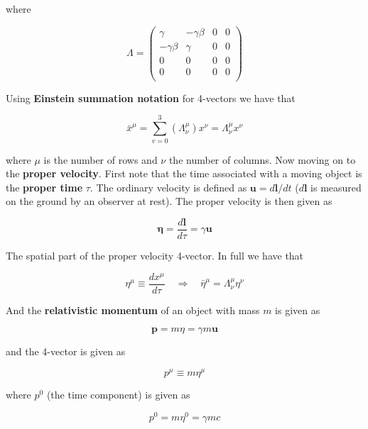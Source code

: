 \documentclass[a4paper]{article}
\begin{document}
where

\begin{equation*}
    \Lambda
    =
    \begin{pmatrix}
        \gamma & -\gamma\beta & 0 & 0 \\
        -\gamma\beta & \gamma & 0 & 0 \\
        0 & 0 & 0 & 0 \\
        0 & 0 & 0 & 0 \\
    \end{pmatrix}
\end{equation*}

Using \textbf{Einstein summation notation} for 4-vectors we have that

\begin{equation*}
    \bar{x}^\mu=\sum_{v=0}^{3}(\Lambda_\nu^\mu)x^\nu=\Lambda_\nu^\mu x^\nu
\end{equation*}

where $\mu$ is the number of rows and $\nu$ the number of columns. Now moving on to the \textbf{proper velocity}. First note that the time associated with a moving object is the \textbf{proper time} $\tau$. The ordinary velocity is defined as $\bm{u}=d\bm{l}/dt$ ($d\bm{l}$ is measured on the ground by an observer at rest). The proper velocity is then given as 

\begin{equation*}
    \bm{\eta}=\frac{d\bm{l}}{d\tau}=\gamma\bm{u}
\end{equation*}

The spatial part of the proper velocity 4-vector. In full we have that

\begin{equation*}
    \eta^\mu\equiv\frac{dx^\mu}{d\tau}\quad\Rightarrow\quad\bar{\eta}^\mu=\Lambda_\nu^\mu\eta^\nu
\end{equation*}

And the \textbf{relativistic momentum} of an object with mass $m$ is given as

\begin{equation*}
    \bm{p}=m\eta=\gamma m\bm{u}
\end{equation*}

and the 4-vector is given as

\begin{equation*}
    p^\mu\equiv m\eta^\mu
\end{equation*}

where $p^0$ (the time component) is given as

\begin{equation*}
    p^0=m\eta^0=\gamma mc
\end{equation*}
\end{document}

